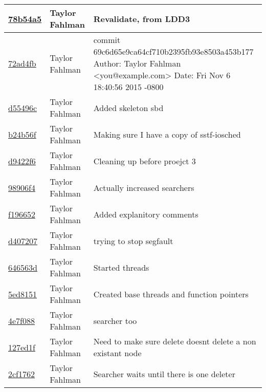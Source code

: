 \begin{tabular}{l l l}
\href{https://github.com/fahlmant/cs444/commit/78b54a5482e78e99c49671fc1bdfc4220cd15e69}{78b54a5} & Taylor Fahlman & Revalidate, from LDD3\\\hline
\href{https://github.com/fahlmant/cs444/commit/72ad4fb072c815d6c043cda034900290b946487f}{72ad4fb} & Taylor Fahlman & commit 69c6d65e9ca64cf710b2395fb93e8503a453b177 Author: Taylor Fahlman <you@example.com> Date:   Fri Nov 6 18:40:56 2015 -0800\\\hline
\href{https://github.com/fahlmant/cs444/commit/d55496cb5992fb77bf617407c1780b2bda22e95b}{d55496c} & Taylor Fahlman & Added skeleton sbd\\\hline
\href{https://github.com/fahlmant/cs444/commit/b24b56fd7a67cd25cae6c0711a306da74a8d7afd}{b24b56f} & Taylor Fahlman & Making sure I have a copy of sstf-iosched\\\hline
\href{https://github.com/fahlmant/cs444/commit/d9422f60653bf4faec3d8f4d7956d74635c64ec1}{d9422f6} & Taylor Fahlman & Cleaning up before proejct 3\\\hline
\href{https://github.com/fahlmant/cs444/commit/98906f41c1901e64ccfbd48175591f9cb4e3e564}{98906f4} & Taylor Fahlman & Actually increased searchers\\\hline
\href{https://github.com/fahlmant/cs444/commit/f1966525e032f176f800cde247991a191c6e96e8}{f196652} & Taylor Fahlman & Added explanitory comments\\\hline
\href{https://github.com/fahlmant/cs444/commit/d4072075c5ac343e9ba1d4fd53da5062d2db6b60}{d407207} & Taylor Fahlman & trying to stop segfault\\\hline
\href{https://github.com/fahlmant/cs444/commit/646563dfc803868c671fc00b9d63418021f4bfe2}{646563d} & Taylor Fahlman & Started threads\\\hline
\href{https://github.com/fahlmant/cs444/commit/5ed8151b742665756b9fde5e531f37ef0e50df03}{5ed8151} & Taylor Fahlman & Created base threads and function pointers\\\hline
\href{https://github.com/fahlmant/cs444/commit/4e7f0888594cdcc6ca918e340622a0c292855ef2}{4e7f088} & Taylor Fahlman & searcher too\\\hline
\href{https://github.com/fahlmant/cs444/commit/127ed1fa55392ce67c5082eed8e2f7a73db2026b}{127ed1f} & Taylor Fahlman & Need to make sure delete doesnt delete a non existant node\\\hline
\href{https://github.com/fahlmant/cs444/commit/2cf17628d8ca7888520cf9403f2577f57806bd71}{2cf1762} & Taylor Fahlman & Searcher waits until there is one deleter\\\hline

\end{tabular}
